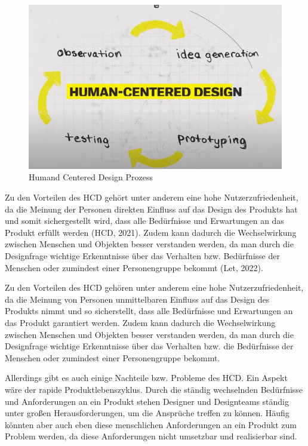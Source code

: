 \begin{figure}[h]
    \centering
    \includegraphics[width=1\textwidth]{images/03/HCD.jpg}
    \caption{Humand Centered Design Prozess}
\end{figure}

Zu den Vorteilen des \acs{HCD} gehört unter anderem eine hohe Nutzerzufriedenheit, da die Meinung der Personen direkten Einfluss auf das Design des Produkts hat und somit sichergestellt wird, dass alle Bedürfnisse und Erwartungen an das Produkt erfüllt werden (HCD, 2021). Zudem kann dadurch die Wechselwirkung zwischen Menschen und Objekten besser verstanden werden, da man durch die Designfrage wichtige Erkenntnisse über das Verhalten bzw. Bedürfnisse der Menschen oder zumindest einer Personengruppe bekommt (Let, 2022).

Zu den Vorteilen des \acs{HCD} gehören unter anderem eine hohe Nutzerzufriedenheit, da die Meinung von Personen unmittelbaren Einfluss auf das Design des Produkts nimmt und so sicherstellt, dass alle Bedürfnisse und Erwartungen an das Produkt garantiert werden.\cite{hcd:2021} Zudem kann dadurch die Wechselwirkung zwischen Menschen und Objekten besser verstanden werden, da man durch die Designfrage wichtige Erkenntnisse über das Verhalten bzw. die Bedürfnisse der Menschen oder zumindest einer Personengruppe bekommt.\cite{let:2022}

Allerdings gibt es auch einige Nachteile bzw. Probleme des \acs{HCD}. Ein Aspekt wäre der rapide Produktlebenszyklus. Durch die ständig wechselnden Bedürfnisse und Anforderungen an ein Produkt stehen Designer und Designteams ständig unter großen Herausforderungen, um die Ansprüche treffen zu können. Häufig könnten aber auch eben diese menschlichen Anforderungen an ein Produkt zum Problem werden, da diese Anforderungen nicht umsetzbar und realisierbar sind.\cite{pod:2016}

